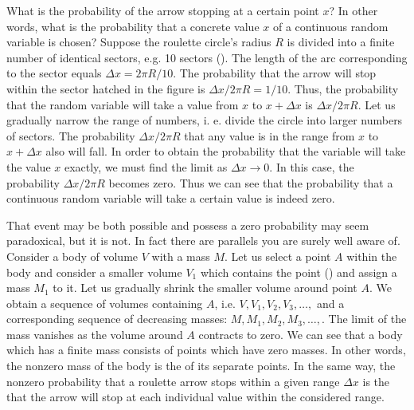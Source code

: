 What is the probability of the arrow stopping at a certain point $x$?
In other words, what is the probability that a concrete value $x$ of a
continuous random variable is chosen? Suppose the roulette
circle's radius $R$ is divided into a finite number of identical
sectors, e.g. 10 sectors (). The length of the
arc corresponding to the sector equals $\Delta x = 2 \pi R/10$. The
probability that the arrow will stop within the sector hatched in the
figure is $\Delta x / 2 \pi R = 1/10$. Thus, the probability that the
random variable will take a value from $x$ to $x + \Delta x$ is
$\Delta x / 2 \pi R $. Let us gradually narrow the range of numbers,
i. e. divide the circle into larger numbers of sectors. The
probability $\Delta x / 2 \pi R $ that any value is in the range from
$x$ to $x + \Delta x$ also will fall. In order to obtain the
probability that the variable will take the value $x$ exactly, we must
find the limit as $\Delta x \to 0 $. In this case, the probability
$\Delta x / 2 \pi R $ becomes zero.  Thus we can see that the
probability that a continuous random variable will take a certain
value is indeed zero.

That event may be both possible and possess a zero probability may
seem paradoxical, but it is not. In fact there are parallels you are
surely well aware of. Consider a body of volume $V$ with a mass
$M$. Let us select a point $A$ within the body and consider a smaller
volume $V_{1}$ which contains the point () and
assign a mass $M_{1}$ to it. Let us gradually shrink the smaller
volume around point $A$. We obtain a sequence of volumes containing
$A$, i.e. $V, V_{1}, V_{2}, V_{3}, \ldots ,$ and a corresponding
sequence of decreasing masses: $M, M_{1}, M_{2}, M_{3}, \ldots ,$. The
limit of the mass vanishes as the volume around $A$ contracts to
zero. We can see that a body which has a finite mass consists of
points which have zero masses. In other words, the nonzero mass of the
body is the  of its
separate points. In the same way, the nonzero probability that a
roulette arrow stops within a given range $\Delta x$ is the  that the arrow will
stop at each individual value within the considered range.

